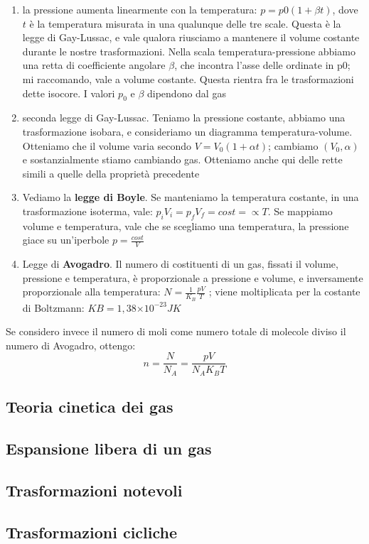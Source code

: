 \documentclass{article}
\begin{document}
\begin{enumerate}
    \item la pressione aumenta linearmente con la temperatura: \(p = p0(1+\beta t)\), dove \(t\) è la temperatura misurata in una qualunque delle tre scale. Questa è la legge di Gay-Lussac, e vale qualora riusciamo a mantenere il volume costante durante le nostre trasformazioni. Nella scala temperatura-pressione abbiamo una retta di coefficiente angolare \(\beta\), che incontra l’asse delle ordinate in p0; mi raccomando, vale a volume costante. Questa rientra fra le trasformazioni dette isocore. I valori \(p_0\) e \(\beta\) dipendono dal gas
    \item seconda legge di Gay-Lussac. Teniamo la pressione costante, abbiamo una trasformazione isobara, e consideriamo un diagramma temperatura-volume. Otteniamo che il volume varia secondo \(V = V_0(1+\alpha t)\); cambiamo \((V_0, \alpha)\) e sostanzialmente stiamo cambiando gas. Otteniamo anche qui delle rette simili a quelle della proprietà precedente
    \item Vediamo la \textbf{legge di Boyle}. Se manteniamo la temperatura costante, in una trasformazione isoterma, vale: \(p_iV_i = p_fV_f = cost =\propto T\). Se mappiamo volume e temperatura, vale che se scegliamo una temperatura, la pressione giace su un’iperbole \(p = \frac{cost}{V} \)
    \item Legge di \textbf{Avogadro}. Il numero di costituenti di un gas, fissati il volume, pressione e temperatura, è proporzionale a pressione e volume, e inversamente proporzionale alla temperatura: \(N = \frac{1}{K_B}  \frac{pV}{T} \) ; viene moltiplicata per la costante di Boltzmann: \(KB = 1, 38\text{×}10^{-23} JK\)
\end{enumerate}
Se considero invece il numero di moli come numero totale di molecole diviso il numero di Avogadro, ottengo:
\[
    n = \frac{N}{N_A} = \frac{pV}{N_AK_BT}
\]
\subsection{Teoria cinetica dei gas}
\subsection{Espansione libera di un gas}
\subsection{Trasformazioni notevoli}
\subsection{Trasformazioni cicliche}
\end{document}
